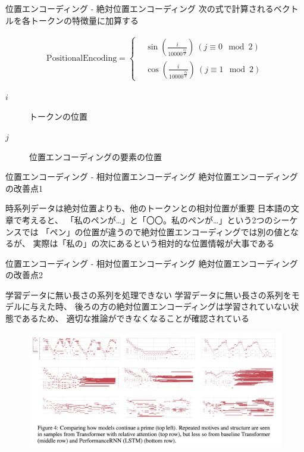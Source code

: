 \documentclass[dvipdfm]{beamer}
\begin{document}
    \begin{frame}{位置エンコーディング - 絶対位置エンコーディング}
        次の式で計算されるベクトルを各トークンの特徴量に加算する
        \begin{block}{}
            \begin{align*}
                \mathrm{Positional Encoding} = \left\{
                    \begin{aligned}
                        & \sin\left(\frac{i}{10000^{\frac{2j}{d}}}\right) \ (j\equiv 0 \mod 2) \\
                        & \cos\left(\frac{i}{10000^{\frac{2j}{d}}}\right) \ (j\equiv 1 \mod 2)
                    \end{aligned}
                    \right.
            \end{align*}

            \begin{description}
                \item[$i$] トークンの位置
                \item[$j$] 位置エンコーディングの要素の位置
            \end{description}
        \end{block}
    \end{frame}
    \begin{frame}{位置エンコーディング - 相対位置エンコーディング}
        絶対位置エンコーディングの改善点1
        \begin{exampleblock}{時系列データは絶対位置よりも、他のトークンとの相対位置が重要}
            日本語の文章で考えると、
            「私のペンが…」と「〇〇。私のペンが…」という2つのシーケンスでは
            「ペン」の位置が違うので絶対位置エンコーディングでは別の値となるが、
            実際は「私の」の次にあるという相対的な位置情報が大事である
        \end{exampleblock}
    \end{frame}
    \begin{frame}{位置エンコーディング - 相対位置エンコーディング}
        絶対位置エンコーディングの改善点2
        \begin{exampleblock}{学習データに無い長さの系列を処理できない}
            学習データに無い長さの系列をモデルに与えた時、
            後ろの方の絶対位置エンコーディングは学習されていない状態であるため、
            適切な推論ができなくなることが確認されている
            
        \end{exampleblock}
        \begin{figure}[h]
            \centering
            \includegraphics[width=.8\linewidth]{catastrophie.png}
        \end{figure}
    \end{frame}
\end{document}
